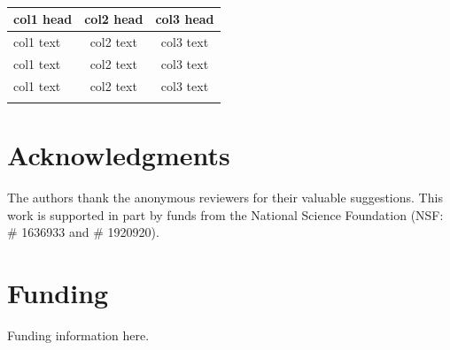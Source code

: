 \documentclass[numbers,webpdf]{ima-authoring-template}%
\theoremstyle{thmstyletwo}%
\numberwithin{equation}{section}
\begin{document}
\begin{table}
\caption{}{%
\begin{tabular}{lcc}%
\toprule
col1 head & col2 head & col3 head \\
\midrule
col1 text & col2 text & col3 text \\
col1 text & col2 text & col3 text \\
col1 text & col2 text & col3 text \\
\botrule
\end{tabular}}{}
\end{table}




\section*{Acknowledgments}
The authors thank the anonymous reviewers for their valuable suggestions. This work is supported in part by funds from the National Science Foundation (NSF: \# 1636933 and \# 1920920).

\section*{Funding}
Funding information here.

%
%
\end{document}
